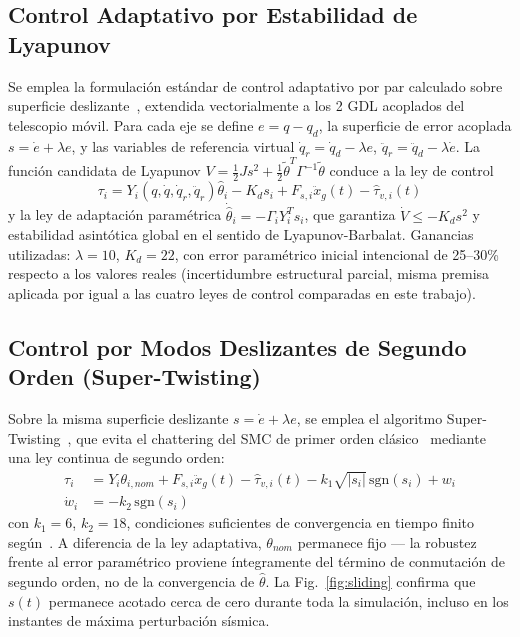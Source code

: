 \documentclass[journal]{IEEEtran}
\begin{document}
\subsection{Control Adaptativo por Estabilidad de Lyapunov}
Se emplea la formulación estándar de control adaptativo por par
calculado sobre superficie deslizante~\cite{slotine1991applied,astrom1995adaptive,sastry1989adaptive},
extendida vectorialmente a los 2 GDL acoplados del telescopio móvil. Para
cada eje se define $e=q-q_d$, la superficie de error acoplada
$s=\dot e+\lambda e$, y las variables de referencia virtual
$\dot q_r=\dot q_d-\lambda e$, $\ddot q_r=\ddot q_d-\lambda\dot e$. La
función candidata de Lyapunov $V=\tfrac12 Js^2+\tfrac12\tilde\theta^T\Gamma^{-1}\tilde\theta$
conduce a la ley de control
\begin{equation}
\tau_i = Y_i(q,\dot q,\dot q_r,\ddot q_r)\hat\theta_i - K_d s_i + F_{s,i}\ddot x_g(t) - \hat\tau_{v,i}(t)
\label{eq:adaptive_law}
\end{equation}
y la ley de adaptación paramétrica $\dot{\hat\theta}_i = -\Gamma_i Y_i^T s_i$,
que garantiza $\dot V\le-K_d s^2$ y estabilidad asintótica global en el
sentido de Lyapunov-Barbalat. Ganancias utilizadas: $\lambda=10$,
$K_d=22$, con error paramétrico inicial intencional de 25--30\% respecto
a los valores reales (incertidumbre estructural parcial, misma premisa
aplicada por igual a las cuatro leyes de control comparadas en este
trabajo).

\subsection{Control por Modos Deslizantes de Segundo Orden (Super-Twisting)}
\label{sec:smc}
Sobre la misma superficie deslizante $s=\dot e+\lambda e$, se emplea el
algoritmo Super-Twisting~\cite{moreno2012strict}, que evita el chattering
del SMC de primer orden clásico~\cite{utkin1977variable}
mediante una ley continua de segundo orden:
\begin{align}
\tau_i &= Y_i\theta_{i,nom} + F_{s,i}\ddot x_g(t) - \hat\tau_{v,i}(t) - k_1\sqrt{|s_i|}\,\mathrm{sgn}(s_i) + w_i\\
\dot w_i &= -k_2\,\mathrm{sgn}(s_i)
\end{align}
con $k_1=6$, $k_2=18$, condiciones suficientes de convergencia en tiempo
finito según~\cite{moreno2012strict}. A diferencia de la ley adaptativa,
$\theta_{nom}$ permanece fijo --- la robustez frente al error paramétrico
proviene íntegramente del término de conmutación de segundo orden, no de
la convergencia de $\hat\theta$. La Fig.~\ref{fig:sliding} confirma que
$s(t)$ permanece acotado cerca de cero durante toda la simulación,
incluso en los instantes de máxima perturbación sísmica.
\end{document}
